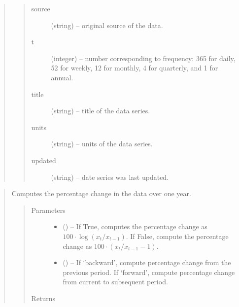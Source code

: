 \documentclass[letterpaper,10pt,openany,oneside,english]{sphinxmanual}
\begin{document}
\begin{fulllineitems}
\begin{quote}
\begin{quote}
\begin{description}
\item[{source}] \leavevmode
(string) -- original source of the data.

\item[{t}] \leavevmode
(integer) -- number corresponding to frequency: 365 for daily, 52 for weekly, 12 for monthly, 4 for quarterly, and 1 for annual.

\item[{title}] \leavevmode
(string) -- title of the data series.

\item[{units}] \leavevmode
(string) -- units of the data series.

\item[{updated}] \leavevmode
(string) -- date series was last updated.

\end{description}\end{quote}
\end{quote}

\begin{quote}

\begin{fulllineitems}
\label{\detokenize{series_class:fredpy.series.apc}}
Computes the percentage change in the data over one year.
\begin{quote}\begin{description}
\item[{Parameters}] \leavevmode\begin{itemize}
\item {} 
 (\href{https://docs.python.org/2/library/functions.html\#bool}{}) -- If True, computes the percentage change as \(100\cdot\log(x_{t}/x_{t-1})\). If False, compute the percentage change as \(100\cdot\left( x_{t}/x_{t-1} - 1\right)\).

\item {} 
 (\href{https://docs.python.org/2/library/string.html\#module-string}{}) -- If `backward', compute percentage change from the previous period. If `forward', compute percentage change from current to subsequent period.

\end{itemize}

\item[{Returns}] \leavevmode
{\hyperref[\detokenize{series_class:fredpy.series}]{}}


\end{description}
\end{quote}
\end{fulllineitems}
\end{quote}
\end{fulllineitems}
\end{document}
